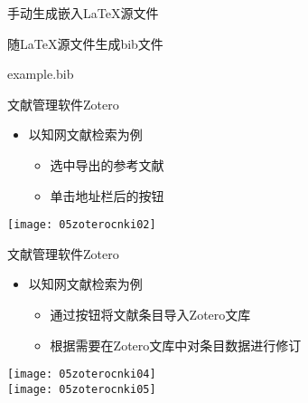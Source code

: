 \documentclass[fontset = none, t]{ctexbeamer}
\begin{document}
\begin{frame}[fragile]{手动生成}{嵌入\LaTeX 源文件}
\begin{spacing}{1.3}
\begin{center}
\begin{minipage}[h]{0.55\linewidth}
\begin{textcb}{随\LaTeX 源文件生成bib文件}
\begin{filecontents}{example.bib}
\begin{frame}[fragile]{文献管理软件}{Zotero}
  \begin{spacing}{1.2}
    \begin{itemize}
    \item 以\alert{知网}文献检索为例
      \begin{itemize}
      \item 选中导出的参考文献
      \item 单击地址栏后的按钮
      \end{itemize}
    \end{itemize}    
    \begin{center}
      \begin{annotatedFigure}
        {\texttt{[image: 05zoterocnki02]}}
      \end{annotatedFigure}      
    \end{center}
  \end{spacing}
\end{frame}

\begin{frame}[fragile]{文献管理软件}{Zotero}
  \begin{spacing}{1.2}
    \begin{itemize}
    \item 以\alert{知网}文献检索为例
      \begin{itemize}
      \item 通过按钮将文献条目导入Zotero文库
      \item 根据需要在Zotero文库中对条目数据进行修订
      \end{itemize}
    \end{itemize}    
    \begin{center}
      \texttt{[image: 05zoterocnki04]}\\%
      \texttt{[image: 05zoterocnki05]}
    \end{center}
  \end{spacing}
\end{frame}


\end{filecontents}
\end{textcb}
\end{minipage}
\end{center}
\end{spacing}
\end{frame}
\end{document}

